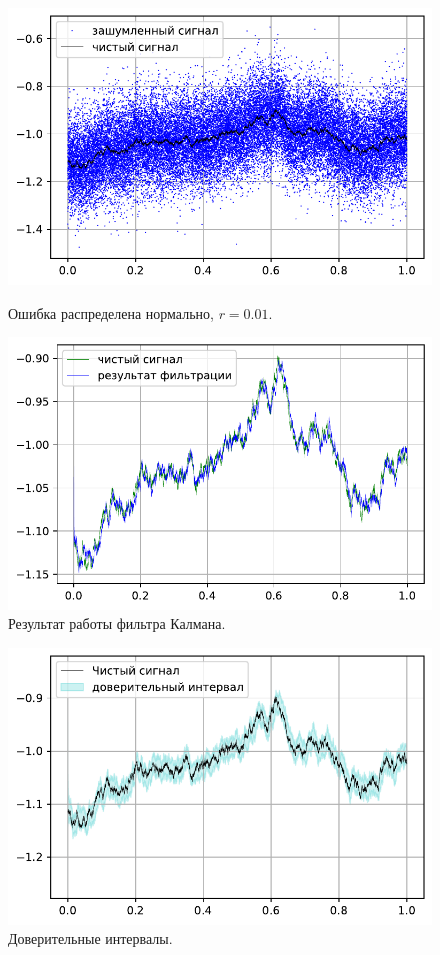 \documentclass[16pt]{article}
\begin{document}
\begin{figure}[h]
	\center
	\includegraphics[scale=0.7]{10_1.pdf}
	\caption{Ошибка распределена нормально, $r = 0.01$.}
	\includegraphics[scale=0.7]{10_2.pdf}
	\caption{Результат работы фильтра Калмана.}
\end{figure}

\begin{figure}[h]
	\center
	\includegraphics[scale=0.7]{10_3.pdf}
	\caption{Доверительные интервалы.}
\end{figure}
\end{document}
